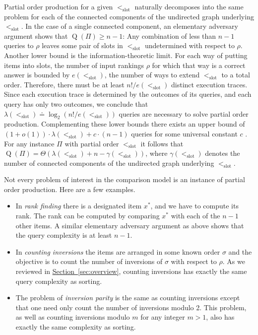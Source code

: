 \documentclass[11pt]{article}
\numberwithin{equation}{section}
\theoremstyle{definition}
\theoremstyle{plain}
\newcommand{\expref}[2]{\hyperref[#2]{#1~\ref{#2}}}
\newcommand{\slotorder}{<_\mathrm{slot}}
\newcommand{\ranking}{\rho}
\newcommand{\ordering}{\sigma}
\DeclareMathOperator{\DQ}{Q}
\begin{document}
Partial order production for a given $\slotorder$ naturally decomposes into the same problem for each of the connected components of the undirected graph underlying $\slotorder$. In the case of a single connected component, an elementary adversary argument shows that $\DQ(\Pi) \ge n-1$: Any combination of less than $n-1$ queries to $\ranking$ leaves some pair of slots in $\slotorder$ undetermined with respect to $\ranking$. Another lower bound is the information-theoretic limit. For each way of putting items into slots, the number of input rankings $\ranking$ for which that way is a correct answer is bounded by $e(\slotorder)$, the number of ways to extend $\slotorder$ to a total order. Therefore, there must be at least $n!/e(\slotorder)$ distinct execution traces. Since each execution trace is determined by the outcomes of its queries, and each query has only two outcomes, we conclude that $\lambda(\slotorder) \doteq \log_2(n!/e(\slotorder))$ queries are necessary to solve partial order production. Complementing these lower bounds there exists an upper bound of $(1 + o(1))\cdot \lambda(\slotorder) + c \cdot (n-1)$ queries for some universal constant $c$ \cite{CFJJM2008}. For any
%
instance $\Pi$ with partial order $\slotorder$ it follows that $\DQ(\Pi)= \Theta(\lambda(\slotorder) + n - \gamma(\slotorder))$, where $\gamma(\slotorder)$ denotes the number of connected components of the undirected graph underlying $\slotorder$. 

Not every problem of interest in the comparison model is an instance of partial order production. Here are a few examples.
\begin{itemize}
\item In \emph{rank finding} there is a designated item $x^*$, and we have to compute its rank. The rank can be computed by comparing $x^*$ with each of the $n-1$ other items. A similar elementary adversary argument as above shows that the query complexity is at least $n-1$.
\item In \emph{counting inversions} the items are arranged in some known order $\ordering$ and the objective is to count the number of inversions of $\ordering$ with respect to $\ranking$. As we reviewed in \expref{Section}{sec:overview}, counting inversions has exactly the same query complexity as sorting.
\item The problem of \emph{inversion parity} is the same as counting inversions except that one need only count the number of inversions modulo 2. This problem, as well as counting inversions modulo $m$ for any integer $m > 1$, also has exactly the same complexity as sorting.
\end{itemize}
\end{document}
